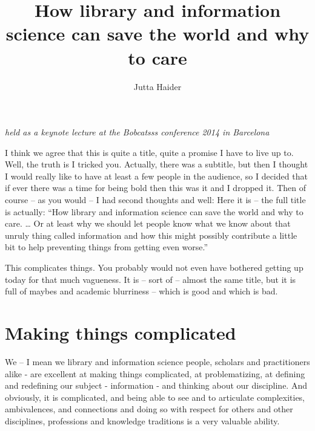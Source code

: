 ﻿\documentclass[a4paper,
fontsize=11pt,
oneside,
numbers=noperiodatend,
parskip=half-,
bibliography=totoc,
final
]{scrartcl}
\title{\LARGE{How library and information science can save the world and why to care}} %
\author{Jutta Haider} %
\date{}
\begin{document}
\maketitle
\thispagestyle{fancyplain} 


\emph{held as a keynote lecture at the Bobcatsss conference 2014 in
Barcelona}

I think we agree that this is quite a title, quite a promise I have to
live up to. Well, the truth is I tricked you. Actually, there was a
subtitle, but then I thought I would really like to have at least a few
people in the audience, so I decided that if ever there was a time for
being bold then this was it and I dropped it. Then of course -- as you
would -- I had second thoughts and well: Here it is -- the full title is
actually: \enquote{How library and information science can save the
world and why to care. \ldots{} Or at least why we should let people
know what we know about that unruly thing called information and how
this might possibly contribute a little bit to help preventing things
from getting even worse.}

This complicates things. You probably would not even have bothered
getting up today for that much vagueness. It is -- sort of -- almost the
same title, but it is full of maybes and academic blurriness -- which is
good and which is bad.

\section*{Making things
complicated}\label{making-things-complicated}

We -- I mean we library and information science people, scholars and
practitioners alike - are excellent at making things complicated, at
problematizing, at defining and redefining our subject - information -
and thinking about our discipline. And obviously, it is complicated, and
being able to see and to articulate complexities, ambivalences, and
connections and doing so with respect for others and other disciplines,
professions and knowledge traditions is a very valuable ability.
\end{document}
